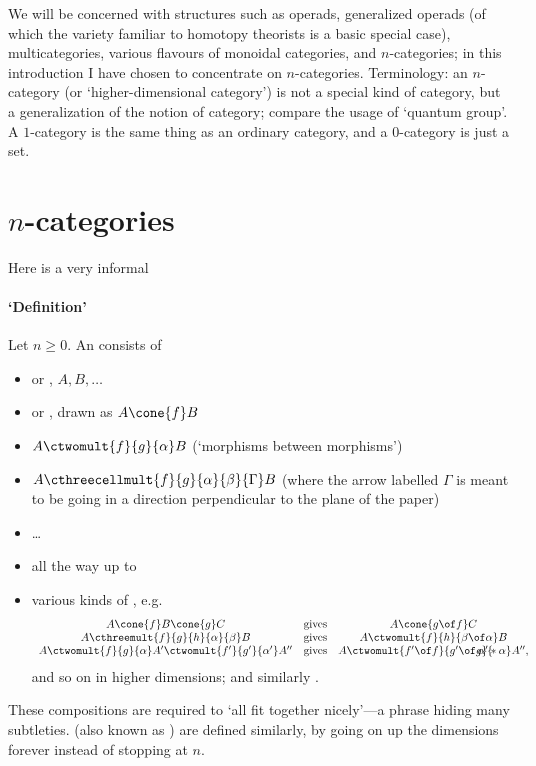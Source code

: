We will be concerned with structures such as operads, generalized operads
(of which the variety familiar to homotopy theorists is a basic special
case), multicategories, various flavours of monoidal categories, and
$n$-categories; in this introduction I have chosen to concentrate on
$n$-categories.  Terminology: an $n$-category (or `higher-dimensional
category')%
%
%
is not a special kind of category, but a generalization of the
notion of category; compare the usage of `quantum group'.  A $1$-category%
%
%
is the same thing as an ordinary category, and a $0$-category%
%
%
is just a
set.


\section*{$n$-categories}

Here is a very informal

\paragraph*{`Definition'} Let $n\geq 0$.  An
%
%
%
consists of 
%
\begin{itemize}
\item {}%
%
%
or , $A, B, \ldots$
\item {} or , drawn as
$A \cone{f} B$ 
\item {} $A \ctwomult{f}{g}{\alpha} B$ (`morphisms between
morphisms') 
\item {}
$A \cthreecellmult{f}{g}{\alpha}{\beta}{\Gamma} B$ 
(where the arrow
labelled $\Gamma$ is meant to be going in a direction perpendicular to the
plane of the paper)
\item \ldots
\item all the way up to 
\item various kinds of , e.g.
\[
\begin{array}{ccc}
A \cone{f} B \cone{g} C					&\textrm{gives}
&A \cone{g\of f} C 			\\
A \cthreemult{f}{g}{h}{\alpha}{\beta} B			&\textrm{gives}
&A \ctwomult{f}{h}{\beta\of\alpha} B	
\label{p:2-cell-comps}
\\
A \ctwomult{f}{g}{\alpha} A' \ctwomult{f'}{g'}{\alpha'}
A'' 							&\textrm{gives}
&A \ctwomult{f'\of f}{g'\of g}{\!\!\!\!\!\!\!\!\alpha' *\alpha} A'',
\end{array}
\]
and so on in higher dimensions; and similarly .
\end{itemize}
%
These compositions are required to `all fit together nicely'---a phrase
hiding many subtleties. 
% 
%
%
%
(also known as ) are
defined similarly, by going on up the dimensions forever instead of stopping
at $n$.

